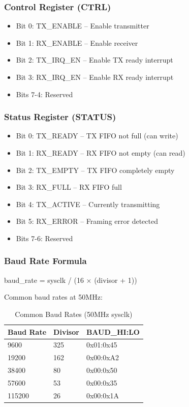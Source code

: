 \documentclass[11pt,a4paper]{article}
\begin{document}
\subsubsection{Control Register (CTRL)}

\begin{itemize}
    \item Bit 0: TX\_ENABLE -- Enable transmitter
    \item Bit 1: RX\_ENABLE -- Enable receiver
    \item Bit 2: TX\_IRQ\_EN -- Enable TX ready interrupt
    \item Bit 3: RX\_IRQ\_EN -- Enable RX ready interrupt
    \item Bits 7-4: Reserved
\end{itemize}

\subsubsection{Status Register (STATUS)}

\begin{itemize}
    \item Bit 0: TX\_READY -- TX FIFO not full (can write)
    \item Bit 1: RX\_READY -- RX FIFO not empty (can read)
    \item Bit 2: TX\_EMPTY -- TX FIFO completely empty
    \item Bit 3: RX\_FULL -- RX FIFO full
    \item Bit 4: TX\_ACTIVE -- Currently transmitting
    \item Bit 5: RX\_ERROR -- Framing error detected
    \item Bits 7-6: Reserved
\end{itemize}

\subsubsection{Baud Rate Formula}

baud\_rate = sysclk / (16 × (divisor + 1))

Common baud rates at 50MHz:

\begin{table}[H]
\centering
\begin{tabular}{lll}
\toprule
\textbf{Baud Rate} & \textbf{Divisor} & \textbf{BAUD\_HI:LO} \\
\midrule
9600 & 325 & 0x01:0x45 \\
19200 & 162 & 0x00:0xA2 \\
38400 & 80 & 0x00:0x50 \\
57600 & 53 & 0x00:0x35 \\
115200 & 26 & 0x00:0x1A \\
\bottomrule
\end{tabular}
\caption{Common Baud Rates (50MHz sysclk)}
\end{table}
\end{document}
